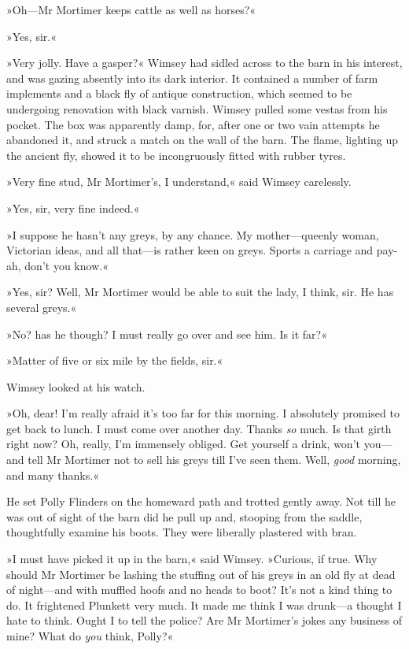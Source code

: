 »Oh—Mr Mortimer keeps cattle as well as horses?«

»Yes, sir.«

»Very jolly. Have a gasper?« Wimsey had sidled across to the barn in his interest, and was gazing absently into its dark interior. It contained a number of farm implements and a black fly of antique construction, which seemed to be undergoing renovation with black varnish. Wimsey pulled some vestas from his pocket. The box was apparently damp, for, after one or two vain attempts he abandoned it, and struck a match on the wall of the barn. The flame, lighting up the ancient fly, showed it to be incongruously fitted with rubber tyres.

»Very fine stud, Mr Mortimer's, I understand,« said Wimsey carelessly.

»Yes, sir, very fine indeed.«

»I suppose he hasn't any greys, by any chance. My mother—queenly woman, Victorian ideas, and all that—is rather keen on greys. Sports a carriage and pay-ah, don't you know.«

»Yes, sir? Well, Mr Mortimer would be able to suit the lady, I think, sir. He has several greys.«

»No? has he though? I must really go over and see him. Is it far?«

»Matter of five or six mile by the fields, sir.«

Wimsey looked at his watch.

»Oh, dear! I'm really afraid it's too far for this morning. I absolutely promised to get back to lunch. I must come over another day. Thanks \textit{so} much. Is that girth right now? Oh, really, I'm immensely obliged. Get yourself a drink, won't you—and tell Mr Mortimer not to sell his greys till I've seen them. Well, \textit{good} morning, and many thanks.«

He set Polly Flinders on the homeward path and trotted gently away. Not till he was out of sight of the barn did he pull up and, stooping from the saddle, thoughtfully examine his boots. They were liberally plastered with bran.

»I must have picked it up in the barn,« said Wimsey. »Curious, if true. Why should Mr Mortimer be lashing the stuffing out of his greys in an old fly at dead of night—and with muffled hoofs and no heads to boot? It's not a kind thing to do. It frightened Plunkett very much. It made me think I was drunk—a thought I hate to think. Ought I to tell the police? Are Mr Mortimer's jokes any business of mine? What do \textit{you} think, Polly?«

